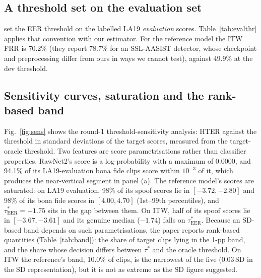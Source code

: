 \documentclass[10pt]{article}
\newcommand{\tauE}{\tau^{*}_{\mathrm{EER}}}
\newcommand{\wide}[1]{\begingroup\footnotesize\setlength{\tabcolsep}{3.5pt}\resizebox{\textwidth}{!}{}\endgroup}
\begin{document}
\begin{table}[!ht]
\caption{Ends of the dev-equivalent interval of \(\tauE\), FRR/FAR on ITW and DF21 at the ends and at the registered threshold, and the share
of ITW clips (genuine/spoof) inside the interval.}
\label{tab:interval}
\centering
\wide{s_tab_interval}
\end{table}

\subsection{A threshold set on the evaluation set}
\citet{zhou26_eer_hides} set the EER threshold on the labelled LA19 \emph{evaluation} scores. Table~\ref{tab:evalthr} applies
that convention with our estimator. For the reference model the ITW FRR is 70.2\% (they report 78.7\% for an SSL-AASIST detector, whose checkpoint and preprocessing differ from ours in ways we cannot test), against 49.9\% at the dev threshold.

\begin{table}[!ht]
\caption{EER threshold set on the LA19 evaluation scores (Zhou and Wang's convention) against the registered dev threshold.}
\label{tab:evalthr}
\centering
\wide{s_tab_evalthr}
\end{table}

\subsection{Sensitivity curves, saturation and the rank-based band}
Fig.~\ref{fig:sens} shows the round-1 threshold-sensitivity analysis: HTER against the threshold in standard deviations of the target
scores, measured from the target-oracle threshold. Two features are score parametrisations rather than classifier properties. RawNet2's
score is a log-probability with a maximum of 0.0000, and 94.1\% of its LA19-evaluation bona fide clips score within \(10^{-3}\) of it, which
produces the near-vertical segment in panel (a). The reference model's scores are saturated: on LA19 evaluation, 98\% of its spoof scores lie
in \([-3.72,-2.80]\) and 98\% of its bona fide scores in \([4.00,4.70]\) (1st--99th percentiles), and \(\tauE=-1.75\) sits in the gap between them. On ITW, half of its spoof scores lie in \([-3.67,-3.61]\) and its genuine median (\(-1.74\)) falls on \(\tauE\). Because an SD-based
band depends on such parametrisations, the paper reports rank-based quantities (Table~\ref{tab:band}): the share of target clips lying in
the 1-pp band, and the share whose decision differs between \(\tau^{*}\) and the oracle threshold. On ITW the reference's band, 10.0\% of
clips, is the narrowest of the five (0.03\,SD in the SD representation), but it is not as extreme as the SD figure suggested.
\end{document}

